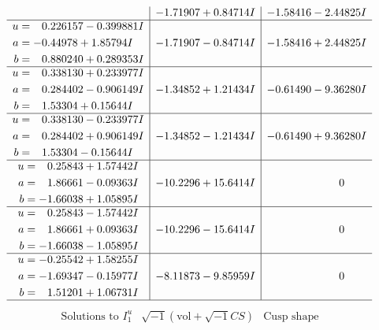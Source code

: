 \documentclass[1p]{elsarticle_modified}
\theoremstyle{definition}
\newcommand{\I}{\sqrt{-1}}
\begin{document}
$$\begin{array}{c|c|c}
 & -1.71907 + 0.84714 I & -1.58416 - 2.44825 I \\ \hline\begin{aligned}
u &= \phantom{-}0.226157 - 0.399881 I \\
a &= -0.44978 + 1.85794 I \\
b &= \phantom{-}0.880240 + 0.289353 I\end{aligned}
 & -1.71907 - 0.84714 I & -1.58416 + 2.44825 I \\ \hline\begin{aligned}
u &= \phantom{-}0.338130 + 0.233977 I \\
a &= \phantom{-}0.284402 - 0.906149 I \\
b &= \phantom{-}1.53304 + 0.15644 I\end{aligned}
 & -1.34852 + 1.21434 I & -0.61490 - 9.36280 I \\ \hline\begin{aligned}
u &= \phantom{-}0.338130 - 0.233977 I \\
a &= \phantom{-}0.284402 + 0.906149 I \\
b &= \phantom{-}1.53304 - 0.15644 I\end{aligned}
 & -1.34852 - 1.21434 I & -0.61490 + 9.36280 I \\ \hline\begin{aligned}
u &= \phantom{-}0.25843 + 1.57442 I \\
a &= \phantom{-}1.86661 - 0.09363 I \\
b &= -1.66038 + 1.05895 I\end{aligned}
 & -10.2296 + 15.6414 I & \phantom{-0.000000 } 0 \\ \hline\begin{aligned}
u &= \phantom{-}0.25843 - 1.57442 I \\
a &= \phantom{-}1.86661 + 0.09363 I \\
b &= -1.66038 - 1.05895 I\end{aligned}
 & -10.2296 - 15.6414 I & \phantom{-0.000000 } 0 \\ \hline\begin{aligned}
u &= -0.25542 + 1.58255 I \\
a &= -1.69347 - 0.15977 I \\
b &= \phantom{-}1.51201 + 1.06731 I\end{aligned}
 & -8.11873 - 9.85959 I & \phantom{-0.000000 } 0\\
 \hline 
 \end{array}$$\newpage$$\begin{array}{c|c|c}  
\text{Solutions to }I^u_{1}& \I (\text{vol} + \sqrt{-1}CS) & \text{Cusp shape}\\

\end{array}$$
\end{document}
